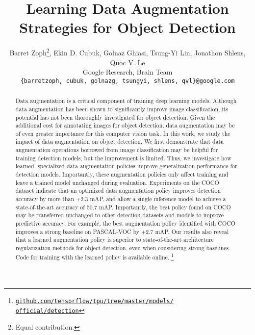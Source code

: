 \documentclass[10pt,twocolumn,letterpaper]{article}
\begin{document}
\title{Learning Data Augmentation Strategies for Object Detection}
\author{Barret Zoph\thanks{Equal contribution.}, Ekin D. Cubuk\footnotemark[1], Golnaz Ghiasi, Tsung-Yi Lin, Jonathon Shlens, Quoc V. Le \\
Google Research, Brain Team \\
\texttt{\{barretzoph, cubuk, golnazg, tsungyi, shlens, qvl\}@google.com}
}

\maketitle



\begin{abstract}
Data augmentation is a critical component of training deep learning models. Although data augmentation has been shown to significantly improve
image classification, its potential has not been thoroughly investigated for 
object detection.
Given the additional cost for annotating images for object detection, data augmentation may be of even greater importance for this computer vision task.
In this work, we study the impact of data augmentation on object detection. We first demonstrate that data augmentation operations borrowed from image classification may be helpful for training detection models, but the improvement is limited.
Thus, we investigate how learned, specialized data augmentation policies
improve generalization performance for detection models.
Importantly, these augmentation policies only affect training and leave a trained model unchanged during evaluation.
Experiments on the COCO dataset indicate that an optimized data augmentation policy improves detection accuracy by more than +2.3 mAP, and allow a single inference model to achieve a state-of-the-art accuracy of 50.7 mAP. Importantly, the best policy found on COCO may be transferred unchanged to other detection datasets and models to improve predictive accuracy. For example, the best  augmentation policy identified with COCO improves a strong baseline on PASCAL-VOC by +2.7 mAP. Our results also reveal that a learned augmentation policy is superior to state-of-the-art architecture regularization methods for object detection, even when considering strong baselines. Code for training with the learned policy is available online.
\footnote{\texttt{\href{}{github.com/tensorflow/tpu/tree/master/models/ \\ official/detection}}}

\end{abstract}
\end{document}
